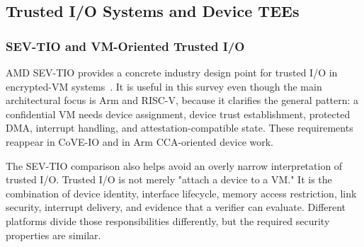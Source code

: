 \subsection{Trusted I/O Systems and Device TEEs}

\subsubsection{SEV-TIO and VM-Oriented Trusted I/O}

AMD SEV-TIO provides a concrete industry design point for trusted I/O in
encrypted-VM systems~\cite{amd_sev_tio_2023}. It is useful in this survey even
though the main architectural focus is Arm and RISC-V, because it clarifies the
general pattern: a confidential VM needs device assignment, device trust
establishment, protected DMA, interrupt handling, and attestation-compatible
state. These requirements reappear in CoVE-IO and in Arm CCA-oriented device
work.

The SEV-TIO comparison also helps avoid an overly narrow interpretation of
trusted I/O. Trusted I/O is not merely "attach a device to a VM." It is the
combination of device identity, interface lifecycle, memory access restriction,
link security, interrupt delivery, and evidence that a verifier can evaluate.
Different platforms divide those responsibilities differently, but the required
security properties are similar.

